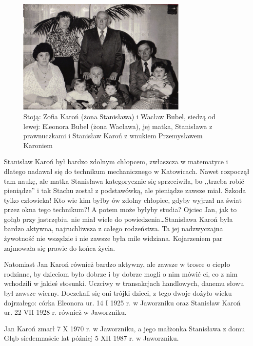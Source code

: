 \begin{figure}[!h]
\begin{center}
\includegraphics[width=0.75\textwidth]{zdjecia/eleonora_i_waclaw_bublowie.jpg}
\caption[Eleonora i Wacław Bublowie]{Stoją: Zofia Karoń (żona Stanisława) i Wacław Bubel, siedzą od lewej: Eleonora Bubel (żona Wacława), jej matka, Stanisława z prawnuczkami i Stanisław Karoń z wnukiem Przemysławem Karoniem}
\label{rys:eleonora_i_waclaw_bublowie}
\end{center}
\end{figure}
Stanisław Karoń był bardzo zdolnym chłopcem, zwłaszcza w matematyce i dlatego nadawał się do technikum mechanicznego w Katowicach. Nawet rozpoczął tam naukę, ale matka Stanisława kategorycznie się sprzeciwiła, bo ,,trzeba robić pieniądze'' i tak Stachu został z podstawówką, ale pieniądze zawsze miał. Szkoda tylko człowieka! Kto wie kim byłby ów zdolny chłopiec, gdyby wyjrzał na świat przez okna tego technikum?! A potem może byłyby studia? Ojciec Jan, jak to gołąb przy jastrzębiu, nie miał wiele do powiedzenia\ldots Stanisława Karoń była bardzo aktywna, najruchliwsza z całego rodzeństwa. Ta jej nadzwyczajna żywotność nie wszędzie i nie zawsze była mile widziana. Kojarzeniem par zajmowała się prawie do końca życia.

Natomiast Jan Karoń również bardzo aktywny, ale zawsze w trosce o ciepło rodzinne, by dzieciom było dobrze i by dobrze mogli o nim mówić ci, co z nim wchodzili w jakieś stosunki. Uczciwy w transakcjach handlowych, danemu słowu był zawsze wierny. Doczekali się oni trójki dzieci, z tego dwoje dożyło wieku dojrzałego: córka Eleonora ur. 14 I 1925 r. w Jaworzniku oraz Stanisław Karoń ur. 22 VII 1928 r. również w Jaworzniku.

Jan Karoń zmarł 7 X 1970 r. w Jaworzniku, a jego małżonka Stanisława z domu Głąb siedemnaście lat później 5 XII 1987 r. w Jaworzniku.


